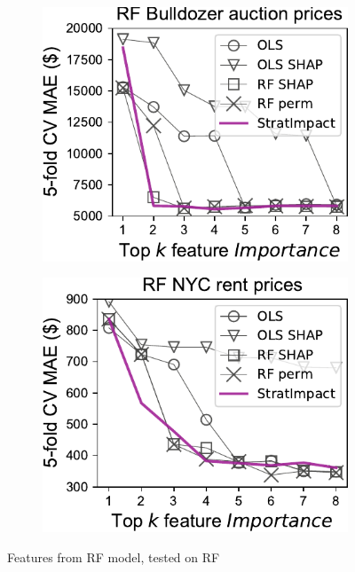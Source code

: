 \documentclass[11pt]{article}
\begin{document}
\begin{figure}
\begin{subfigure}{.245\textwidth}
    \centering
\includegraphics[scale=0.45]{images/bulldozer-topk-RF-Importance.pdf}
\end{subfigure}%
\hfill
\begin{subfigure}{.245\textwidth}
    \centering
\includegraphics[scale=0.45]{images/rent-topk-RF-Importance.pdf}
\end{subfigure}
\caption[short]{Features from RF model, tested on RF}
\label{fig:topk}
\end{figure}
\end{document}

